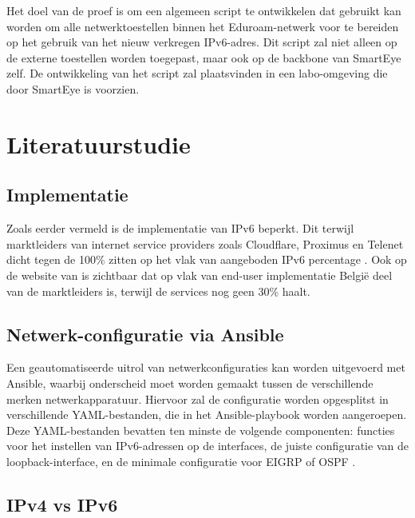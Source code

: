 Het doel van de proef is om een algemeen script te ontwikkelen dat gebruikt kan worden om alle netwerktoestellen binnen het Eduroam-netwerk voor te bereiden op het gebruik van het nieuw verkregen IPv6-adres. 
Dit script zal niet alleen op de externe toestellen worden toegepast, maar ook op de backbone van SmartEye zelf. 
De ontwikkeling van het script zal plaatsvinden in een labo-omgeving die door SmartEye is voorzien.


\section{Literatuurstudie}%
\label{sec:literatuurstudie}

\subsection{Implementatie}
\label{sec:implementatie}

Zoals eerder vermeld is de implementatie van IPv6 beperkt. 
Dit terwijl marktleiders van internet service providers zoals Cloudflare, Proximus en Telenet dicht tegen de 100\% zitten op het vlak van aangeboden IPv6 percentage \autocite{Test2024}. 
Ook op de website van \textcite{EuropeanCommission} is zichtbaar dat op vlak van end-user implementatie België deel van de marktleiders is, terwijl de services nog geen 30\% haalt.

\subsection{Netwerk-configuratie via Ansible}
\label{sec:netconfigAnsible}

Een geautomatiseerde uitrol van netwerkconfiguraties kan worden uitgevoerd met Ansible, waarbij onderscheid moet worden gemaakt tussen de verschillende merken netwerkapparatuur. 
Hiervoor zal de configuratie worden opgesplitst in verschillende YAML-bestanden, die in het Ansible-playbook worden aangeroepen. 
Deze YAML-bestanden bevatten ten minste de volgende componenten: 
functies voor het instellen van IPv6-adressen op de interfaces, 
de juiste configuratie van de loopback-interface, en de minimale configuratie voor EIGRP of OSPF \autocite{MohdFuziMohdFaris2021}.

\subsection{IPv4 vs IPv6}
\label{sec:IPv4vsIPv6}

